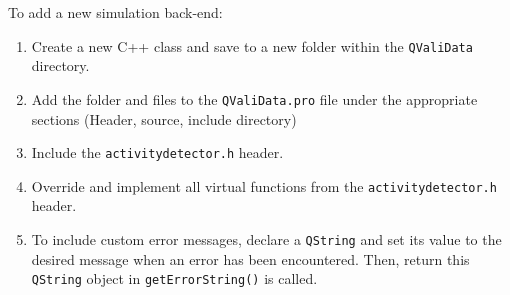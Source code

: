 \documentclass[]{article}
\begin{document}
		To add a new simulation back-end:
		\begin{enumerate}
			\item Create a new C++ class and save to a new folder within the \texttt{QValiData} directory. 
			\item Add the folder and files to the \texttt{QValiData.pro} file under the appropriate sections (Header, source, include directory)
			\item Include the \texttt{activitydetector.h} header. 
			\item Override and implement all virtual functions from the \texttt{activitydetector.h} header.
			\item To include custom error messages, declare a \texttt{QString} and set its value to the desired message when an error has been encountered. Then, return this \texttt{QString} object in \texttt{getErrorString()} is called.
		\end{enumerate}
		
\end{document}
